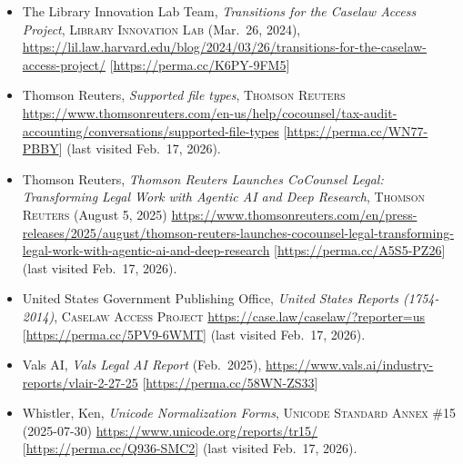 \documentclass[
]{article}
\begin{document}
\begin{itemize}
\item
  The Library Innovation Lab Team, \emph{Transitions for the Caselaw Access Project}, \textsc{Library Innovation Lab} (Mar.~26, 2024), \url{https://lil.law.harvard.edu/blog/2024/03/26/transitions-for-the-caselaw-access-project/} {[}\url{https://perma.cc/K6PY-9FM5}{]}
\item
  Thomson Reuters, \emph{Supported file types}, \textsc{Thomson Reuters} \url{https://www.thomsonreuters.com/en-us/help/cocounsel/tax-audit-accounting/conversations/supported-file-types} {[}\url{https://perma.cc/WN77-PBBY}{]} (last visited Feb.~17, 2026).
\item
  Thomson Reuters, \emph{Thomson Reuters Launches CoCounsel Legal: Transforming Legal Work with Agentic AI and Deep Research}, \textsc{Thomson Reuters} (August 5, 2025) \url{https://www.thomsonreuters.com/en/press-releases/2025/august/thomson-reuters-launches-cocounsel-legal-transforming-legal-work-with-agentic-ai-and-deep-research} {[}\url{https://perma.cc/A5S5-PZ26}{]} (last visited Feb.~17, 2026).
\item
  United States Government Publishing Office, \emph{United States Reports (1754-2014)}, \textsc{Caselaw Access Project} \url{https://case.law/caselaw/?reporter=us} {[}\url{https://perma.cc/5PV9-6WMT}{]} (last visited Feb.~17, 2026).
\item
  Vals AI, \emph{Vals Legal AI Report} (Feb.~2025), \url{https://www.vals.ai/industry-reports/vlair-2-27-25} {[}\url{https://perma.cc/58WN-ZS33}{]}
\item
  Whistler, Ken, \emph{Unicode Normalization Forms}, \textsc{Unicode Standard Annex \#15} (2025-07-30) \url{https://www.unicode.org/reports/tr15/} {[}\url{https://perma.cc/Q936-SMC2}{]} (last visited Feb.~17, 2026).
\end{itemize}
\end{document}
